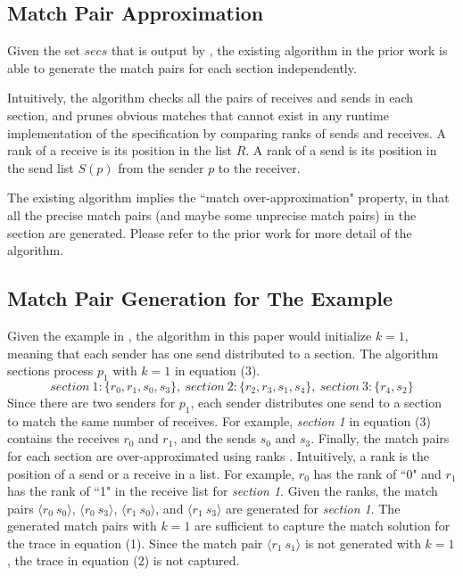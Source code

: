 \subsection{Match Pair Approximation}

Given the set $\mathit{secs}$ that is output by , the existing algorithm in the prior work \cite{DBLP:conf/kbse/HuangMM13} is able to generate the match pairs for each section independently. 

Intuitively, the algorithm checks all the pairs of receives and sends in each section, and prunes obvious matches that cannot exist in any runtime implementation of the specification by comparing ranks of sends and receives. 
A rank of a receive is its position in the list $R$. 
A rank of a send is its position in the send list $S(p)$ from the sender $p$ to the receiver.    

The existing algorithm implies the ``match over-approximation" property, in that all the precise match pairs (and maybe some unprecise match pairs) in the section are generated.
Please refer to the prior work \cite{DBLP:conf/kbse/HuangMM13} for more detail of the algorithm. 

\subsection{Match Pair Generation for The Example}
Given the example in , the algorithm in this paper would initialize $k=1$, meaning that each sender has one send distributed to a section. The algorithm sections process $p_1$ with $k=1$ in equation (3).
\begin{equation} 
\mathit{section\ 1: }\{r_0,r_1,s_0,s_3\},\ \mathit{section\ 2: }\{r_2,r_3,s_1,s_4\},\ \mathit{section\ 3: }\{r_4,s_2\}
\end{equation}
Since there are two senders for $p_1$, each sender distributes one send to a section to match the same number of receives. 
For example, \textit{section 1} in equation (3) contains the receives $r_0$ and $r_1$, and the sends $s_0$ and $s_3$. Finally, the match pairs for each section are over-approximated using ranks \cite{DBLP:conf/kbse/HuangMM13}. Intuitively, a rank is the position of a send or a receive in a list. For example, $r_0$ has the rank of ``0" and $r_1$ has the rank of ``1" in the receive list for \textit{section 1}. Given the ranks, the match pairs $\langle r_0\ s_0\rangle$, $\langle r_0\ s_3\rangle$, $\langle r_1\ s_0\rangle$, and $\langle r_1\ s_3\rangle$ are generated for \textit{section 1}.
The generated match pairs with $k=1$ are sufficient to capture the match solution for the trace in equation (1). 
Since the match pair $\langle r_1\ s_1\rangle$ is not generated with $k=1$, the trace in equation (2) is not captured. 

